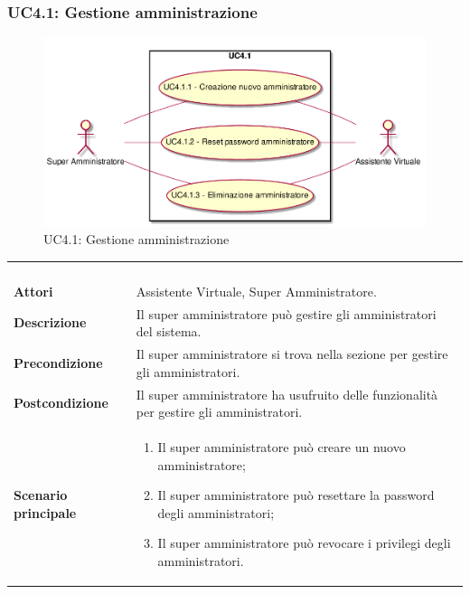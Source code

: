 \newpage\subsubsection{UC4.1: Gestione amministrazione}
\label{UC4.1}
\begin{figure}[h]
	\centering
	\includegraphics[width=\textwidth,height=\textheight,keepaspectratio]{images/UseCaseUC41.png}
	\caption{UC4.1: Gestione amministrazione}
\end{figure}
\begin{longtable}{l|p{10cm}}
	\rowcolor[gray]{0.8} \multicolumn{2}{c}{} \\
	\rowcolor[gray]{0.8} \multicolumn{2}{c}{\textbf{UC4.1 - Gestione amministrazione}} \\
	\rowcolor[gray]{0.8} \multicolumn{2}{c}{} \\
	\hline
	&\\
	\textbf{Attori} & Assistente Virtuale, Super Amministratore.\\[7pt]
	\textbf{Descrizione} & Il super amministratore può gestire gli amministratori del sistema.\\[7pt]
	\textbf{Precondizione} & Il super amministratore si trova nella sezione per gestire gli amministratori.\\[7pt]
	\textbf{Postcondizione} & Il super amministratore ha usufruito delle funzionalità per gestire gli amministratori.\\[7pt]
	\textbf{Scenario principale} &\begin{enumerate}
		\item  Il super amministratore può creare un nuovo amministratore;
		\item  Il super amministratore può resettare la password degli amministratori;
		\item  Il super amministratore può revocare i privilegi degli amministratori.
	\end{enumerate}
	\\[7pt]\hline
\end{longtable}


